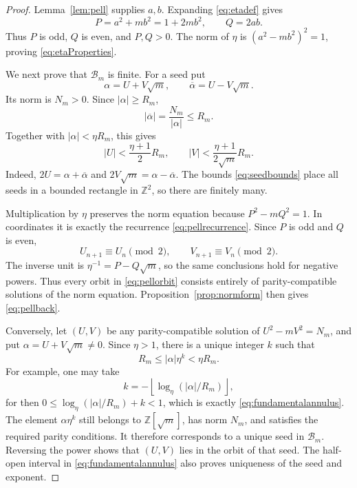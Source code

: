 \documentclass[11pt,a4paper]{amsart}
\numberwithin{equation}{section}
\theoremstyle{definition}
\newcommand{\Z}{\mathbb Z}
\begin{document}
\begin{proof}
Lemma~\ref{lem:pell} supplies \(a,b\).  Expanding
\eqref{eq:etadef} gives
\begin{equation*}
 P=a^2+mb^2=1+2mb^2,
 \qquad Q=2ab.
\end{equation*}
Thus \(P\) is odd, \(Q\) is even, and \(P,Q>0\).  The norm of
\(\eta\) is \((a^2-mb^2)^2=1\), proving
\eqref{eq:etaProperties}.

We next prove that \(\mathcal B_m\) is finite.  For a seed put
\begin{equation*}
 \alpha=U+V\sqrt m,
 \qquad \overline\alpha=U-V\sqrt m.
\end{equation*}
Its norm is \(N_m>0\).  Since \(|\alpha|\ge R_m\),
\begin{equation*}
 |\overline\alpha|=\frac{N_m}{|\alpha|}\le R_m.
\end{equation*}
Together with \(|\alpha|<\eta R_m\), this gives
\begin{equation}
 |U|<\frac{\eta+1}{2}R_m,
 \qquad
 |V|<\frac{\eta+1}{2\sqrt m}R_m.
 \label{eq:seedbounds}
\end{equation}
Indeed, \(2U=\alpha+\overline\alpha\) and
\(2V\sqrt m=\alpha-\overline\alpha\).  The bounds
\eqref{eq:seedbounds} place all seeds in a bounded rectangle in
\(\Z^2\), so there are finitely many.

Multiplication by \(\eta\) preserves the norm equation because
\(P^2-mQ^2=1\).  In coordinates it is exactly the recurrence
\eqref{eq:pellrecurrence}.  Since \(P\) is odd and \(Q\) is even,
\begin{equation*}
 U_{n+1}\equiv U_n\pmod2,
 \qquad V_{n+1}\equiv V_n\pmod2.
\end{equation*}
The inverse unit is \(\eta^{-1}=P-Q\sqrt m\), so the same conclusions
hold for negative powers.  Thus every orbit in \eqref{eq:pellorbit}
consists entirely of parity-compatible solutions of the norm equation.
Proposition~\ref{prop:normform} then gives \eqref{eq:pellback}.

Conversely, let \((U,V)\) be any parity-compatible solution of
\(U^2-mV^2=N_m\), and put \(\alpha=U+V\sqrt m\ne0\).  Since
\(\eta>1\), there is a unique integer \(k\) such that
\begin{equation}
 R_m\le |\alpha|\eta^k<\eta R_m.
 \label{eq:fundamentalannulus}
\end{equation}
For example, one may take
\begin{equation*}
 k=-\left\lfloor\log_{\eta}(|\alpha|/R_m)\right\rfloor,
\end{equation*}
for then
\(0\le\log_{\eta}(|\alpha|/R_m)+k<1\), which is exactly
\eqref{eq:fundamentalannulus}.
The element \(\alpha\eta^k\) still belongs to \(\Z[\sqrt m]\), has
norm \(N_m\), and satisfies the required parity conditions.  It
therefore corresponds to a unique seed in \(\mathcal B_m\).  Reversing
the power shows that \((U,V)\) lies in the orbit of that seed.  The
half-open interval in \eqref{eq:fundamentalannulus} also proves
uniqueness of the seed and exponent.


\end{proof}
\end{document}
